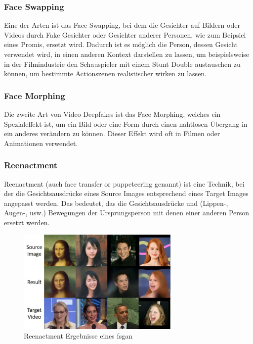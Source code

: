 \subsubsection{Face Swapping}
Eine der Arten ist das Face Swapping, bei dem die Gesichter auf Bildern oder Videos durch Fake Gesichter oder Gesichter anderer Personen, wie zum Beipsiel eines Promis, ersetzt wird.
Dadurch ist es möglich die Person, dessen Gesicht verwendet wird, in einen anderen Kontext darstellen zu lassen, um beispielsweise in der Filmindustrie den Schauspieler mit einem Stunt Double austauschen zu können, um bestimmte Actionszenen realistischer wirken zu lassen.\cite{ResearchGate}

\subsubsection{Face Morphing}
Die zweite Art von Video Deepfakes ist das Face Morphing, welches ein Spezialeffekt ist, um ein Bild oder eine Form durch einen nahtlosen Übergang in ein anderes verändern zu können. Dieser Effekt wird oft in Filmen oder Animationen verwendet.\cite{ResearchGate}

\subsubsection{Reenactment}
Reenactment (auch  face transfer or puppeteering genannt) ist eine Technik, bei der die Gesichtsausdrücke eines
Source Images entsprechend eines Target Images angepasst werden.
Das bedeutet, das die Gesichtsausdrücke und (Lippen-, Augen-, usw.) Bewegungen der Ursprungsperson mit denen einer
anderen Person ersetzt werden.
\begin{figure}[h]
    \includegraphics[width=0.7\textwidth]{Bilder/Reenactment}
    \centering
    \caption{Reenactment Ergebnisse eines \gls{fsgan}\cite{face-swapping-and-reenactment}}
    \label{fig:reenactment}
\end{figure}

